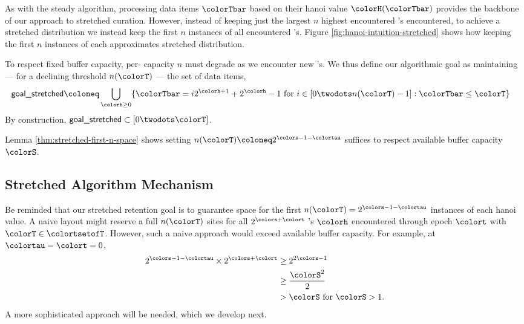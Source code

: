 As with the steady algorithm, processing data items $\colorTbar$ based on their hanoi value $\colorH(\colorTbar)$ provides the backbone of our approach to stretched curation.
However, instead of keeping just the largest $n$ highest encountered \hv{}'s encountered, to achieve a stretched distribution we instead keep the first $n$ instances of all encountered \hv{}'s.
Figure \ref{fig:hanoi-intuition-stretched} shows how keeping the first $n$ instances of each \hv{} approximates stretched distribution.

To respect fixed buffer capacity, per-\hv{} capacity $n$ must degrade as we encounter new \hv{}'s.
We thus define our algorithmic goal as maintaining --- for a declining threshold $n(\colorT)$ --- the set of data items,
\begin{align*}
\textsf{goal\_stretched}
&\coloneq
\bigcup_{\colorh \geq 0}
\{ \colorTbar = i2^{\colorh + 1} + 2^{\colorh} - 1 \text{ for } i \in [0 \twodots n(\colorT) - 1] : \colorTbar \leq \colorT \}
\end{align*}
By construction, $\textsf{goal\_stretched} \subset [0 \twodots \colorT]$.

Lemma \ref{thm:stretched-first-n-space} shows setting $n(\colorT) \coloneq 2^{\colors - 1 - \colortau}$ suffices to respect available buffer capacity $\colorS$.


\subsection{Stretched Algorithm Mechanism}
\label{sec:stretched-mechanism}



Be reminded that our stretched retention goal is to guarantee space for the first $n(\colorT) =  2^{\colors - 1 - \colortau}$ instances of each hanoi value.
A naive layout might reserve a full $n(\colorT)$ sites for all $2^{\colors + \colort}$ \hv{}'s $\colorh$ encountered through epoch $\colort$ with $\colorT \in \colortsetofT$.
However, such a naive approach would exceed available buffer capacity.
For example, at $\colortau=\colort=0$,
\begin{align*}
2^{\colors - 1 - \colortau} \times 2^{\colors + \colort}
&\geq
2^{2\colors - 1}\\
&\geq
\frac{\colorS^{2}}{2}\\
&> \colorS \text{ for } \colorS > 1.
\end{align*}
A more sophisticated approach will be needed, which we develop next.

